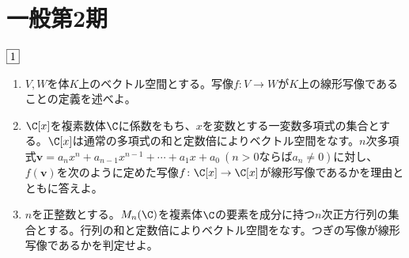 \documentclass[dvipdfmx]{jsreport}
\begin{document}
\section{一般第2期}
\begin{tcolorbox} %
	$\fbox{1}$
\begin{enumerate}
	\item $V, W$を体$K$上のベクトル空間とする。写像$f\colon V\to W$が$K$上の線形写像であることの定義を述べよ。
	\item $\C[x]$を複素数体$\C$に係数をもち、$x$を変数とする一変数多項式の集合とする。$\C[x]$は通常の多項式の和と定数倍によりベクトル空間をなす。$n$次多項式$\bm{v}= a_n x^n+ a_{n- 1}x^{n- 1}+ \cdots+ a_1 x+ a_0\ (n> 0ならばa_n\ne 0)$に対し、$f(\bm{v})$を次のように定めた写像$f\colon \C[x]\to \C[x]$が線形写像であるかを理由とともに答えよ。
	\item $n$を正整数とする。$M_n(\C)$を複素体$\C$の要素を成分に持つ$n$次正方行列の集合とする。行列の和と定数倍によりベクトル空間をなす。つぎの写像が線形写像であるかを判定せよ。
\end{enumerate}
\end{tcolorbox}
\end{document}
